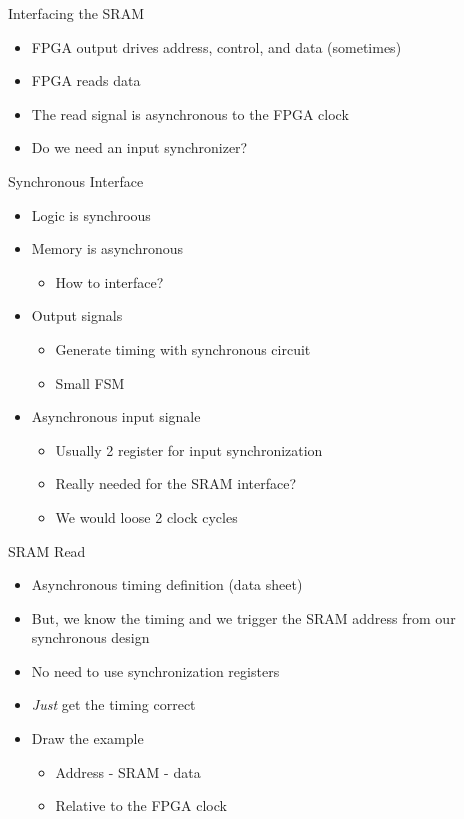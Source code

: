 \begin{frame}[fragile]{Interfacing the SRAM}
\begin{itemize}
\item FPGA output drives address, control, and data (sometimes)
\item FPGA reads data
\item The read signal is asynchronous to the FPGA clock
\item Do we need an input synchronizer?
\end{itemize}
\end{frame}

\begin{frame}[fragile]{Synchronous Interface}
\begin{itemize}
\item Logic is synchroous
\item Memory is asynchronous
\begin{itemize}
\item How to interface?
\end{itemize}
\item Output signals
\begin{itemize}
\item Generate timing with synchronous circuit
\item Small FSM
\end{itemize}
\item Asynchronous input signale
\begin{itemize}
\item Usually 2 register for input synchronization
\item Really needed for the SRAM interface?
\item We would loose 2 clock cycles
\end{itemize}
\end{itemize}
\end{frame}


\begin{frame}[fragile]{SRAM Read}
\begin{itemize}
\item Asynchronous timing definition (data sheet)
\item But, we know the timing and we trigger the SRAM address from
our synchronous design
\item No need to use synchronization registers
\item \emph{Just} get the timing correct
\item Draw the example
\begin{itemize}
\item Address - SRAM - data
\item Relative to the FPGA clock
\end{itemize}
\end{itemize}
\end{frame}

